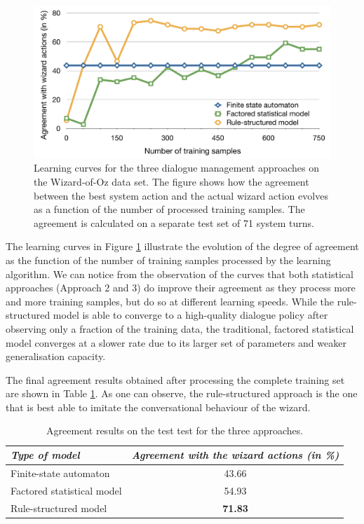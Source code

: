 \begin{figure}[ht]
\vspace{3mm}\centering\includegraphics[scale=0.35]{imgs/curve-exp3.pdf}
\caption{Learning curves for the three dialogue management approaches on the Wizard-of-Oz data set.  The figure shows how the agreement between the best system action and the actual wizard action evolves as a function of the number of processed training samples.  The agreement is calculated on a separate test set of 71 system turns.}
\label{fig:curve-exp3}
\end{figure}


The learning curves in Figure \ref{fig:curve-exp3} illustrate the evolution of the degree of agreement as the function of the number of training samples processed by the learning algorithm.  We can notice from the observation of the curves that both statistical approaches (Approach 2 and 3) do improve their agreement as they process more and more training samples, but do so at different learning speeds.  While the rule-structured model is able to converge to a high-quality dialogue policy after observing only a fraction of the training data, the traditional, factored statistical model converges at a slower rate due to its larger set of parameters and weaker generalisation capacity.

The final agreement results obtained after processing the complete training set are shown in Table \ref{table:learning-exp3}.  As one can observe, the rule-structured approach is the one that is best able to imitate the conversational behaviour of the wizard. 

\begin{table}[ht]
\begin{center}
\begin{tabular}{|l|c|} \hline
\textit{Type of model} & \textit{Agreement with the wizard actions (in \%) } \\ \hline \hline
Finite-state automaton & 43.66 \\ \hline
Factored statistical model & 54.93 \\ \hline
Rule-structured model & \textbf{71.83} \\ \hline
\end{tabular}
\end{center}
\vspace{-2mm}
\caption{Agreement results on the test test for the three approaches.}
\vspace{-2mm}
\label{table:learning-exp3}
\end{table}

